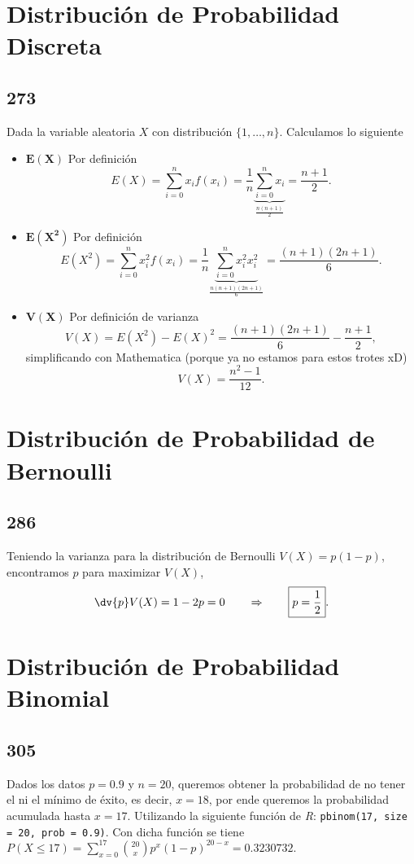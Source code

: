 \section{Distribución de Probabilidad Discreta}
\subsection*{273}
Dada la variable aleatoria $X$ con distribución $\{ 1,\ldots ,n \}$. Calculamos lo siguiente
\begin{itemize}
	\item $\mathbf{E(X)}$ Por definición
		$$E(X) = \sum _{i=0} ^n x_i f(x_i) = \frac{1}{n} \underbrace{\sum _{i=0} ^n x_i}_{\frac{n(n+1)}{2}} = \frac{n+1}{2}.$$
	\item $\mathbf{E(X^2)}$ Por definición
		$$E(X^2) = \sum _{i=0} ^n x_i ^2 f(x_i) = \frac{1}{n} \underbrace{\sum _{i=0} ^n x_i ^2 x_i ^2}_{\frac{n(n+1)(2n+1)}{6}} = \frac{(n+1)(2n+1)}{6} .$$
	\item $\mathbf{V(X)}$ Por definición de varianza
		$$V(X) = E(X^2) - E(X)^2 = \frac{(n+1)(2n+1)}{6} - \frac{n+1}{2},$$
	simplificando con Mathematica (porque ya no estamos para estos trotes xD)
		$$V(X) = \frac{n^2 - 1}{12} .$$
\end{itemize}

\section{Distribución de Probabilidad de Bernoulli}
\subsection*{286}
Teniendo la varianza para la distribución de Bernoulli $V(X) = p(1-p)$, encontramos $p$ para maximizar $V(X)$,
	$$\dv{p} V(X) = 1-2p = 0 \quad \quad \Rightarrow \quad \quad \boxed{p=\frac{1}{2}}.$$
\section{Distribución de Probabilidad Binomial}
\subsection*{305}
Dados los datos $p = 0.9$ y $n = 20$, queremos obtener la probabilidad de no tener el ni el mínimo de éxito, es decir, $x = 18$, por ende queremos la probabilidad acumulada hasta $x = 17$. Utilizando la siguiente función de \textit{R}: \texttt{pbinom(17, size = 20, prob = 0.9)}. Con dicha función se tiene $P(X\leq 17) = \displaystyle\sum _{x=0} ^{17} \binom{20}{x} p^x (1-p)^{20-x} = 0.3230732.$
